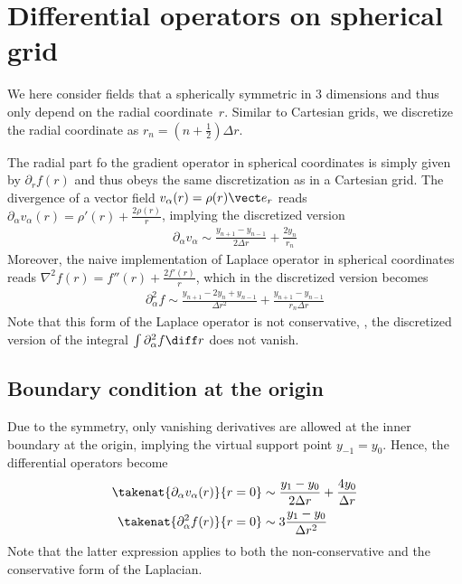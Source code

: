 \documentclass[
	superscriptaddress,
	twocolumn,
	aps, pre
]{revtex4-1}
\newcommand{\dr}{\Delta r}
\begin{document}
\section{Differential operators on spherical grid}
We here consider fields that a spherically symmetric in $3$ dimensions and thus only depend on the radial coordinate~$r$.
Similar to Cartesian grids, we discretize the radial coordinate as $r_n = (n + \frac12) \dr$.

The radial part fo the gradient operator in spherical coordinates is simply given by $\partial_r f(r)$ and thus obeys the same discretization as in a Cartesian grid.
The divergence of a vector field $v_\alpha(r) = \rho(r) \vect e_r$ reads
$\partial_\alpha v_\alpha(r) =  \rho'(r) + \frac{2\rho(r)}{r}$, implying the discretized version
\begin{align}
	\partial_\alpha v_\alpha \sim
		\frac{y_{n+1} - y_{n-1}}{2\dr}
		+ \frac{2y_n}{r_n}
\end{align}
Moreover, the naive implementation of Laplace operator in spherical coordinates reads $\nabla^2 f(r) = f''(r) + \frac{2f'(r)}{r}$, which in the discretized version becomes
\begin{align}
	\partial_\alpha^2 f \sim
		\frac{y_{n+1} - 2 y_n + y_{n-1}}{\dr^2}
		+ \frac{y_{n+1} - y_{n-1}}{r_n \dr}
\end{align}
Note that this form of the Laplace operator is not conservative, \ie, the discretized version of the integral $\int \partial_\alpha^2 f \diff r$  does not vanish.


\subsection{Boundary condition at the origin}
Due to the symmetry, only vanishing derivatives are allowed at the inner boundary at the origin, implying the virtual support point $y_{-1} = y_0$.
Hence, the differential operators become
\begin{subequations}
\begin{align}
	\takenat{\partial_\alpha v_\alpha(r)}{r=0} &\sim
		\frac{y_1 - y_0}{2\dr}
		+ \frac{4y_0}{\dr}
\\
	\takenat{\partial_\alpha^2 f(r)}{r=0} &\sim
		3\frac{y_1 -  y_0}{\dr^2}
\end{align}
\end{subequations}
Note that the latter expression applies to both the non-conservative and the conservative form of the Laplacian.
\end{document}
